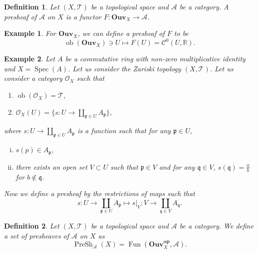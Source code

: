 \documentclass{article}
\newtheorem{definition}{Definition}[section]
\newtheorem{example}{Example}[section]
\numberwithin{equation}{section}
\DeclareMathOperator{\ob}{ob}
\DeclareMathOperator{\Spec}{Spec}
\DeclareMathOperator{\PreSh}{PreSh}
\DeclareMathOperator{\Fun}{Fun}
\begin{document}
\begin{definition}
Let $(X,\mathcal{T})$ be a topological space and $\mathcal{A}$ be a category. A presheaf of $\mathcal{A}$ on $X$ is a functor $F:\mathbf{Ouv}_X\to\mathcal{A}$.
\end{definition}

\begin{example}
For $\mathbf{Ouv}_X$, we can define a presheaf of $F$ to be
\begin{equation*}
\ob(\mathbf{Ouv}_X)\ni U\mapsto F(U) = \mathcal{C}^0(U,\mathbb{R}).
\end{equation*}
\end{example}

\begin{example}
\label{structure_sheaf_ring}
Let $A$ be a commutative ring with non-zero multiplicative identity and $X=\Spec(A)$. Let us consider the Zariski topology $(X,\mathcal{T})$. Let us consider a category $\mathcal{O}_X$ such that
\begin{enumerate}[\textbullet]
\item $\ob(\mathcal{O}_X) = \mathcal{T}$,
\item $\mathcal{O}_X(U) =  \{s:U\to\coprod_{\mathfrak{p}\in U}A_{\mathfrak{p}}\}$,
\end{enumerate}
where $s:U\to\coprod_{\mathfrak{p}\in U}A_{\mathfrak{p}}$ is a function such that for any $\mathfrak{p}\in U$,
\begin{enumerate}[i).]
\item $s(p)\in A_{\mathfrak{p}}$,
\item there exists an open set $V\subset U$ such that $\mathfrak{p}\in V$ and for any $\mathfrak{q}\in V$,  $s(\mathfrak{q})={\frac a b}$ for $b\not\in\mathfrak{q}$. 
\end{enumerate}
Now we define a presheaf by the restrictions of maps such that
\begin{equation*}
s:U\to\coprod_{\mathfrak{p}\in U}A_{\mathfrak{p}} \mapsto s|_V:V\to\coprod_{\mathfrak{q}\in V} A_{\mathfrak{q}}.
\end{equation*}
\end{example}

\begin{definition}
Let $(X,\mathcal{T})$ be a topological space and $\mathcal{A}$ be a category. We define a set of presheaves of $\mathcal{A}$ on $X$ as
\begin{equation*}
\PreSh_{\mathcal{A}}(X)=\Fun(\mathbf{Ouv}_X^{\mathbf{op}},\mathcal{A}).
\end{equation*}
\end{definition}
\end{document}
